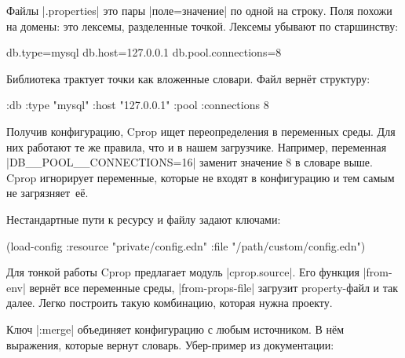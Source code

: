 \begin{english}
\end{english}

Файлы \spverb|.properties| это пары \spverb|поле=значение| по одной на
строку. Поля похожи на домены: это лексемы, разделенные точкой. Лексемы убывают
по старшинству:

\begin{english}
  \begin{ini}
db.type=mysql
db.host=127.0.0.1
db.pool.connections=8
  \end{ini}
\end{english}

Библиотека трактует точки как вложенные словари. Файл верн\"{е}т структуру:

\begin{english}
  \begin{clojure}
{:db {:type "mysql"
      :host "127.0.0.1"
      :pool {:connections 8}}}
  \end{clojure}
\end{english}

Получив конфигурацию, Cprop ищет переопределения в переменных среды. Для них
работают те же правила, что и в нашем загрузчике. Например, переменная
\spverb|DB__POOL__CONNECTIONS=16| заменит значение 8 в словаре выше. Cprop
игнорирует переменные, которые не входят в конфигурацию и тем самым не
загрязняет~е\"{е}.

Нестандартные пути к ресурсу и файлу задают ключами:

\begin{english}
  \begin{clojure}
(load-config
 :resource "private/config.edn"
 :file "/path/custom/config.edn")
  \end{clojure}
\end{english}


Для тонкой работы Cprop предлагает модуль \spverb|cprop.source|. Его функция
\spverb|from-env| верн\"{е}т все переменные среды, \spverb|from-props-file| загрузит
property-файл и так далее. Легко построить такую комбинацию, которая нужна
проекту.

Ключ \spverb|:merge| объединяет конфигурацию с любым источником. В н\"{е}м
выражения, которые вернут словарь. Убер-пример из документации:

